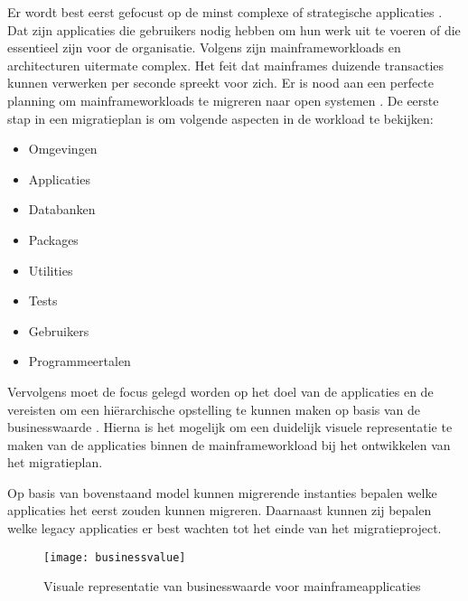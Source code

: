 Er wordt best eerst gefocust op de minst complexe of strategische applicaties \autocite{Korzenlowski2017}. Dat zijn applicaties die gebruikers nodig hebben om hun werk uit te voeren of die essentieel zijn voor de organisatie. Volgens \textcite{Marble2017} zijn mainframeworkloads en architecturen uitermate complex. Het feit dat mainframes duizende transacties kunnen verwerken per seconde spreekt voor zich. Er is nood aan een perfecte planning om mainframeworkloads te migreren naar open systemen \autocite{Marble2017}. De eerste stap in een migratieplan is om volgende aspecten in de workload te bekijken:
    \begin{itemize}
        \item Omgevingen
        \item Applicaties
        \item Databanken
        \item Packages
        \item Utilities
        \item Tests
        \item Gebruikers
        \item Programmeertalen
    \end{itemize}
Vervolgens moet de focus gelegd worden op het doel van de applicaties en de vereisten om een hiërarchische opstelling te kunnen maken op basis van de businesswaarde \autocite{Marble2017}. Hierna is het mogelijk om een duidelijk visuele representatie te maken van de applicaties binnen de mainframeworkload bij het ontwikkelen van het migratieplan. 

\newpage

Op basis van bovenstaand model kunnen migrerende instanties bepalen welke applicaties het eerst zouden kunnen migreren. Daarnaast kunnen zij bepalen welke legacy applicaties er best wachten tot het einde van het migratieproject. 

\begin{figure}
\texttt{[image: businessvalue]}
\caption{Visuale representatie van businesswaarde voor mainframeapplicaties \autocite{Marble2017}}
\end{figure}



\subsection{}
\label{sec:Workloads migreren naar de cloud}

